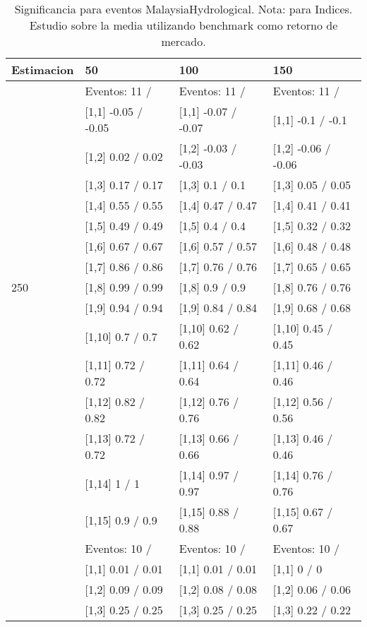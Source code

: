 \begin{table}

\caption{Significancia para eventos MalaysiaHydrological. Nota: para Indices. Estudio sobre la media utilizando benchmark como retorno de mercado.}
\centering
\begin{tabular}[t]{llll}
\toprule
Estimacion & 50 & 100 & 150\\
\midrule
 & Eventos:  11 / & Eventos:  11 / & Eventos:  11 /\\
 & {}[1,1] -0.05  / -0.05 & {}[1,1] -0.07  / -0.07 & {}[1,1] -0.1  / -0.1\\
 & {}[1,2] 0.02  / 0.02 & {}[1,2] -0.03  / -0.03 & {}[1,2] -0.06  / -0.06\\
 & {}[1,3] 0.17  / 0.17 & {}[1,3] 0.1  / 0.1 & {}[1,3] 0.05  / 0.05\\
 & {}[1,4] 0.55  / 0.55 & {}[1,4] 0.47  / 0.47 & {}[1,4] 0.41  / 0.41\\
\addlinespace
 & {}[1,5] 0.49  / 0.49 & {}[1,5] 0.4  / 0.4 & {}[1,5] 0.32  / 0.32\\
 & {}[1,6] 0.67  / 0.67 & {}[1,6] 0.57  / 0.57 & {}[1,6] 0.48  / 0.48\\
 & {}[1,7] 0.86  / 0.86 & {}[1,7] 0.76  / 0.76 & {}[1,7] 0.65  / 0.65\\
250 & {}[1,8] 0.99  / 0.99 & {}[1,8] 0.9  / 0.9 & {}[1,8] 0.76  / 0.76\\
 & {}[1,9] 0.94  / 0.94 & {}[1,9] 0.84  / 0.84 & {}[1,9] 0.68  / 0.68\\
\addlinespace
 & {}[1,10] 0.7  / 0.7 & {}[1,10] 0.62  / 0.62 & {}[1,10] 0.45  / 0.45\\
 & {}[1,11] 0.72  / 0.72 & {}[1,11] 0.64  / 0.64 & {}[1,11] 0.46  / 0.46\\
 & {}[1,12] 0.82  / 0.82 & {}[1,12] 0.76  / 0.76 & {}[1,12] 0.56  / 0.56\\
 & {}[1,13] 0.72  / 0.72 & {}[1,13] 0.66  / 0.66 & {}[1,13] 0.46  / 0.46\\
 & {}[1,14] 1  / 1 & {}[1,14] 0.97  / 0.97 & {}[1,14] 0.76  / 0.76\\
\addlinespace
 & {}[1,15] 0.9  / 0.9 & {}[1,15] 0.88  / 0.88 & {}[1,15] 0.67  / 0.67\\
 & Eventos:  10 / & Eventos:  10 / & Eventos:  10 /\\
 & {}[1,1] 0.01  / 0.01 & {}[1,1] 0.01  / 0.01 & {}[1,1] 0  / 0\\
 & {}[1,2] 0.09  / 0.09 & {}[1,2] 0.08  / 0.08 & {}[1,2] 0.06  / 0.06\\
 & {}[1,3] 0.25  / 0.25 & {}[1,3] 0.25  / 0.25 & {}[1,3] 0.22  / 0.22\\

\end{tabular}
\end{table}
